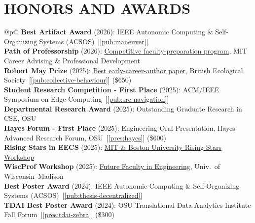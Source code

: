 \section{HONORS AND AWARDS}\label{sec:awards}
{\small
\renewcommand{\arraystretch}{1.3}
\begin{supertabular}{@{}p{\dimexpr{}\tabcolsep\relax}@{}}
\textbf{Best Artifact Award} (2026): IEEE Autonomic Computing \& Self-Organizing Systems (ACSOS)~[\ref{pub:maneuver}] \\
\textbf{Path of Professorship} (2026): \href{https://capd.mit.edu/flagship-graduate-student-professional-development-program-the-path-of-professorship/}{Competitive faculty-preparation program}, MIT Career Advising \& Professional Development \\
\textbf{Robert May Prize} (2025): \href{https://methodsblog.com/2026/03/18/jenna-kline-studying-collective-animal-behaviour-with-drones-and-computer-vision/}{Best early-career-author paper}, British Ecological Society~[\ref{pub:collective-behaviour}] (\$650) \\
\textbf{Student Research Competition - First Place} (2025): ACM/IEEE Symposium on Edge Computing~[\ref{pub:src-navigation}] \\
\textbf{Departmental Research Award} (2025): Outstanding Graduate Research in CSE, OSU \\
\textbf{Hayes Forum - First Place} (2025): Engineering Oral Presentation, Hayes Advanced Research Forum, OSU~[\ref{pres:hayes}] (\$600) \\
\textbf{Rising Stars in EECS} (2025): \href{https://risingstars-eecs.mit.edu/}{MIT \& Boston University Rising Stars Workshop} \\
\textbf{WiscProf Workshop} (2025): \href{https://wiscprof.engr.wisc.edu/}{Future Faculty in Engineering}, Univ.\ of Wisconsin--Madison \\
\textbf{Best Poster Award} (2024): IEEE Autonomic Computing \& Self-Organizing Systems (ACSOS)~[\ref{pub:thesis-decentralized}] \\
\textbf{TDAI Best Poster Award} (2024): OSU Translational Data Analytics Institute Fall Forum~[\ref{pres:tdai-zebra}] (\$300) \\
\end{supertabular}
}

